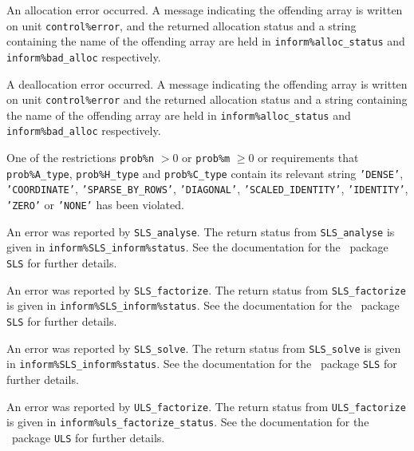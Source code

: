 \documentclass{galahad}
\begin{document}
\begin{description}

 An allocation error occurred.
A message indicating the offending
array is written on unit {\tt control\%error}, and the returned allocation
status and a string containing the name of the offending array
are held in {\tt inform\%alloc\_\-status}
and {\tt inform\%bad\_alloc} respectively.

 A deallocation error occurred.
A message indicating the offending
array is written on unit {\tt control\%error} and the returned allocation
status and a string containing the name of the offending array
are held in {\tt inform\%alloc\_\-status}
and {\tt inform\%bad\_alloc} respectively.

 One of the restrictions
   {\tt prob\%n} $> 0$ or {\tt prob\%m} $\geq  0$
    or requirements that {\tt prob\%A\_type}, {\tt prob\%H\_type} and
    {\tt prob\%C\_\-type} contain its relevant string
    {\tt 'DENSE'}, {\tt 'COORDINATE'}, {\tt 'SPARSE\_BY\_ROWS'},
    {\tt 'DIAGONAL'}, {\tt 'SCALED\_IDENTITY'}, {\tt 'IDENTITY'},
    {\tt 'ZERO'} or {\tt 'NONE'}
    has been violated.


 An error was reported by {\tt SLS\_analyse}. The return
status from {\tt SLS\_analyse} is given in
{\tt inform\%SLS\_inform\%\-status}.
See the documentation for the \galahad\ package {\tt SLS} for further details.

 An error was reported by {\tt SLS\_factorize}.
The return status from {\tt SLS\_factorize} is given in
{\tt inform\%SLS\_\-inform\%status}.
See the documentation for the \galahad\ package {\tt SLS} for further details.

 An error was reported by {\tt SLS\_solve}. The return
status from {\tt SLS\_solve} is given in {\tt inform\%\-SLS\_inform\%status}.
See the documentation for the \galahad\ package {\tt SLS} for further details.

 An error was reported by {\tt ULS\_factorize}.
The return status from {\tt ULS\_factorize} is given in
{\tt inform\%uls\_\-factorize\_\-status}.
See the documentation for the \galahad\ package {\tt ULS} for further details.


\end{description}
\end{document}
